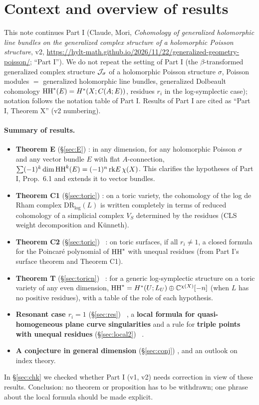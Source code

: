 \section{Context and overview of results}\label{sec:intro}
This note continues Part I (Claude, Mori, \emph{Cohomology of generalized holomorphic line bundles on the generalized complex structure of a holomorphic Poisson structure}, v2, \url{https://hylt-math.github.io/2026/11/22/generalized-geometry-poisson/}; ``Part I''). We do not repeat the setting of Part I (the $\beta$-transformed generalized complex structure $\mathcal J_\sigma$ of a holomorphic Poisson structure $\sigma$, Poisson modules $=$ generalized holomorphic line bundles, generalized Dolbeault cohomology $\mathrm{HH}^*(E)=H^*(X;C(A;E))$, residues $r_i$ in the log-symplectic case); notation follows the notation table of Part I. Results of Part I are cited as ``Part I, Theorem X'' (v2 numbering).

\paragraph{Summary of results.}
\begin{itemize}
\item \textbf{Theorem E} (\S\ref{sec:E}) \tP: in any dimension, for any holomorphic Poisson $\sigma$ and any vector bundle $E$ with flat $A$-connection, $\sum(-1)^k\dim\mathrm{HH}^k(E)=(-1)^n\,\mathrm{rk} E\,\chi(X)$. This clarifies the hypotheses of Part I, Prop.\ 6.1 and extends it to vector bundles.
\item \textbf{Theorem C1} (\S\ref{sec:toric}) \tP: on a toric variety, the cohomology of the log de Rham complex $\mathrm{DR}_{\log}(L)$ is written completely in terms of reduced cohomology of a simplicial complex $V_S$ determined by the residues (CLS weight decomposition and K\"unneth).
\item \textbf{Theorem C2} (\S\ref{sec:toric}) \tP\ \tV: on toric surfaces, if all $r_i\ne1$, a closed formula for the Poincar\'e polynomial of $\mathrm{HH}^*$ with unequal residues (from Part I's surface theorem and Theorem C1).
\item \textbf{Theorem T} (\S\ref{sec:toricn}) \tP\ \tV: for a generic log-symplectic structure on a toric variety of any even dimension, $\mathrm{HH}^*=H^*(U;L_U)\oplus\mathbb C^{\chi(X)}[-n]$ (when $L$ has no positive residues), with a table of the role of each hypothesis.
\item \textbf{Resonant case $r_i=1$} (\S\ref{sec:res}) \tV\ \tK, a \textbf{local formula for quasi-homogeneous plane curve singularities} and a rule for \textbf{triple points with unequal residues} (\S\ref{sec:local2}) \tV\ \tK.
\item \textbf{A conjecture in general dimension} (\S\ref{sec:conj}) \tK, and an outlook on index theory.
\end{itemize}
In \S\ref{sec:chk} we checked whether Part I (v1, v2) needs correction in view of these results. Conclusion: no theorem or proposition has to be withdrawn; one phrase about the local formula should be made explicit.

